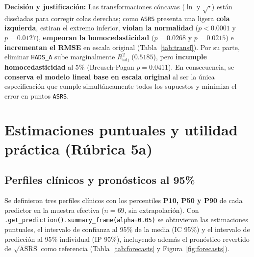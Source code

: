 \documentclass[11pt,letterpaper]{article}
\begin{document}
\textbf{Decisión y justificación:} Las transformaciones cóncavas ($\ln$ y $\sqrt{\cdot}$) están diseñadas para corregir colas derechas; como \texttt{ASRS} presenta una ligera \textbf{cola izquierda}, estiran el extremo inferior, \textbf{violan la normalidad} ($p < 0.0001$ y $p = 0.0127$), \textbf{empeoran la homocedasticidad} ($p = 0.0268$ y $p = 0.0215$) e \textbf{incrementan el RMSE} en escala original (Tabla~\ref{tab:transf}). Por su parte, eliminar \texttt{HADS\_A} sube marginalmente $R^2_{\text{adj}}$ ($0.5185$), pero \textbf{incumple homocedasticidad} al 5\% (Breusch-Pagan $p = 0.0411$). En consecuencia, se \textbf{conserva el modelo lineal base en escala original} al ser la única especificación que cumple simultáneamente todos los supuestos y minimiza el error en puntos \texttt{ASRS}.

\section{Estimaciones puntuales y utilidad práctica (Rúbrica 5a)}

\subsection{Perfiles clínicos y pronósticos al 95\%}

Se definieron tres perfiles clínicos con los percentiles \textbf{P10, P50 y P90} de cada predictor en la muestra efectiva ($n = 69$, sin extrapolación). Con \texttt{.get\_prediction().summary\_frame(alpha=0.05)} se obtuvieron las estimaciones puntuales, el intervalo de confianza al 95\% de la media (IC 95\%) y el intervalo de predicción al 95\% individual (IP 95\%), incluyendo además el pronóstico revertido de $\sqrt{\text{ASRS}}$ como referencia (Tabla~\ref{tab:forecasts} y Figura~\ref{fig:forecasts}).

\begin{table}[H]
  \centering
  \caption{Estimaciones puntuales e intervalos al 95\% para tres perfiles clínicos ($n = 69$).}
  \label{tab:forecasts}
\end{table}
\end{document}
